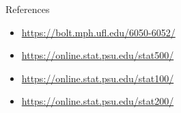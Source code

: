 \begin{frame}[t]{References}
	\begin{itemize}
		\item \url{https://bolt.mph.ufl.edu/6050-6052/}
		\item \url{https://online.stat.psu.edu/stat500/}
		\item \url{https://online.stat.psu.edu/stat100/}
		\item \url{https://online.stat.psu.edu/stat200/}
	\end{itemize}
\end{frame}



